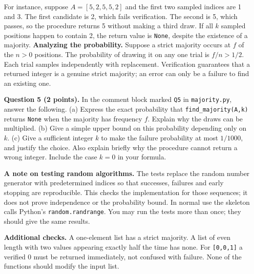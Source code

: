 \documentclass[11pt,a4paper]{article}
\newcommand{\code}[1]{\texttt{#1}}
\newcommand{\q}[2]{\medskip\noindent\textbf{Question #1 (#2 points).} }
\begin{document}
For instance, suppose \(A=[5,2,5,5,2]\) and the first two sampled indices are 1 and 3. The first candidate is 2, which fails verification. The second is 5, which passes, so the procedure returns 5 without making a third draw. If all \(k\) sampled positions happen to contain 2, the return value is \code{None}, despite the existence of a majority.
\newpage
\textbf{Analyzing the probability.} Suppose a strict majority occurs at \(f\) of the \(n>0\) positions. The probability of drawing it on any one trial is \(f/n>1/2\). Each trial samples independently with replacement. Verification guarantees that a returned integer is a genuine strict majority; an error can only be a failure to find an existing one.

\q{5}{2} In the comment block marked \code{Q5} in \code{majority.py}, answer the following. (a) Express the exact probability that \code{find\_majority(A,k)} returns \code{None} when the majority has frequency \(f\). Explain why the draws can be multiplied. (b) Give a simple upper bound on this probability depending only on \(k\). (c) Give a sufficient integer \(k\) to make the failure probability at most \(1/1000\), and justify the choice. Also explain briefly why the procedure cannot return a wrong integer. Include the case \(k=0\) in your formula.

\textbf{A note on testing random algorithms.} The tests replace the random number generator with predetermined indices so that successes, failures and early stopping are reproducible. This checks the implementation for those sequences; it does not prove independence or the probability bound. In normal use the skeleton calls Python's \code{random.randrange}. You may run the tests more than once; they should give the same results.

\textbf{Additional checks.} A one-element list has a strict majority. A list of even length with two values appearing exactly half the time has none. For \code{[0,0,1]} a verified 0 must be returned immediately, not confused with failure. None of the functions should modify the input list.
\end{document}
